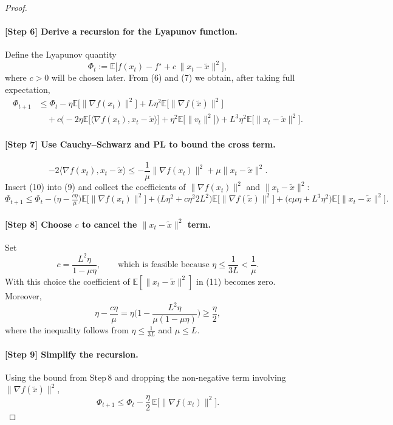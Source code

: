\documentclass{article}
\begin{document}
\begin{proof}
\paragraph{[Step 6] Derive a recursion for the Lyapunov function.}
Define the Lyapunov quantity
\[
\Phi_{t}:= \mathbb{E}\big[f(x_{t})-f^{\star} + c\,\|x_{t}-\tilde{x}\|^{2}\big],
\]
where $c>0$ will be chosen later.  
From (6) and (7) we obtain, after taking full expectation,
\[
\begin{aligned}
\Phi_{t+1}
&\le \Phi_{t}
-\eta\mathbb{E}\!\big[\|\nabla f(x_{t})\|^{2}\big]
+L\eta^{2}\mathbb{E}\!\big[\|\nabla f(\tilde{x})\|^{2}\big] \\
&\quad +c\Big(
-2\eta\mathbb{E}\!\big[\langle\nabla f(x_{t}),x_{t}-\tilde{x}\rangle\big]
+ \eta^{2}\mathbb{E}\!\big[\|v_{t}\|^{2}\big]\Big)
+L^{3}\eta^{2}\mathbb{E}\!\big[\|x_{t}-\tilde{x}\|^{2}\big]. \tag{9}
\end{aligned}
\]

\paragraph{[Step 7] Use Cauchy–Schwarz and PL to bound the cross term.}
\[
-2\langle\nabla f(x_{t}),x_{t}-\tilde{x}\rangle
\le -\frac{1}{\mu}\|\nabla f(x_{t})\|^{2}
+ \mu\|x_{t}-\tilde{x}\|^{2}. \tag{10}
\]
Insert (10) into (9) and collect the coefficients of $\|\nabla f(x_{t})\|^{2}$ and $\|x_{t}-\tilde{x}\|^{2}$:
\[
\Phi_{t+1}\le
\Phi_{t}
-\big(\eta -\tfrac{c\eta}{\mu}\big)\mathbb{E}\!\big[\|\nabla f(x_{t})\|^{2}\big]
+\big(L\eta^{2}+c\eta^{2}2L^{2}\big)\mathbb{E}\!\big[\|\nabla f(\tilde{x})\|^{2}\big]
+\big(c\mu\eta +L^{3}\eta^{2}\big)\mathbb{E}\!\big[\|x_{t}-\tilde{x}\|^{2}\big]. \tag{11}
\]

\paragraph{[Step 8] Choose $c$ to cancel the $\|x_{t}-\tilde{x}\|^{2}$ term.}
Set
\[
c = \frac{L^{2}\eta}{1-\mu\eta},\qquad\text{which is feasible because }\eta\le\frac{1}{3L}<\frac{1}{\mu}.
\]
With this choice the coefficient of $\mathbb{E}[\|x_{t}-\tilde{x}\|^{2}]$ in (11) becomes zero.
Moreover,
\[
\eta-\frac{c\eta}{\mu}
= \eta\Big(1-\frac{L^{2}\eta}{\mu(1-\mu\eta)}\Big)
\ge \frac{\eta}{2},
\]
where the inequality follows from $\eta\le \frac{1}{3L}$ and $\mu\le L$.

\paragraph{[Step 9] Simplify the recursion.}
Using the bound from Step 8 and dropping the non‑negative term involving $\|\nabla f(\tilde{x})\|^{2}$,
\[
\Phi_{t+1}\le \Phi_{t}-\frac{\eta}{2}\,\mathbb{E}\!\big[\|\nabla f(x_{t})\|^{2}\big]. \tag{12}
\]


\end{proof}
\end{document}
